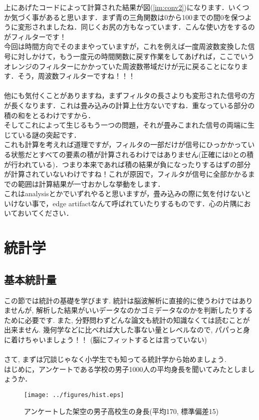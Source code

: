 \documentclass[11pt,a4paper]{ujreport}
\begin{document}
上にあげたコードによって計算された結果が図(\ref{im:conv2})になります．いくつか気づく事があると思います．まず青の三角関数は0から100までの間0を保つように変形されましたね．同じくお尻の方もなっています．こんな使い方をするのがフィルターです！\\
今回は時間方向でそのままやっていますが，これを例えば一度周波数変換した信号に対しかけて，もう一度元の時間関数に戻す作業をしてあげれば，ここでいうオレンジのフィルターにかかっていた周波数帯域だけが元に戻ることになります．そう，周波数フィルターですね！！！\\
\\
他にも気付くことがありますね，まずフィルタの長さよりも変形された信号の方が長くなります．これは畳み込みの計算上仕方ないですね．重なっている部分の積の和をとるわけですから．\\
そしてこれによって生じるもう一つの問題，それが畳みこまれた信号の両端に生じている謎の突起です．\\
これも計算を考えれば道理ですが，フィルタの一部だけが信号にひっかかっている状態だとすべての要素の積が計算されるわけではありません(正確には0との積が行われている)．つまり本来であれば積の結果が負になったりするはずの部分が計算されていないわけですね！これが原因で，フィルタが信号に全部かかるまでの範囲は計算結果が一寸おかしな挙動をします．\\
これはanalysisとかでいずれやると思いますが，畳み込みの際に気を付けないといけない事で，edge artifactなんて呼ばれていたりするものです．心の片隅においておいてください．


\chapter{統計学}
\section{基本統計量}
この節では統計の基礎を学びます. 統計は脳波解析に直接的に使うわけではありませんが, 解析した結果がいいデータなのかゴミデータなのかを判断したりするために必要です. また, 分野問わずどんな論文も統計の知識なくては読むことが出来ません. 幾何学などに比べれば大した事ない量とレベルなので, パパっと身に着けちゃいましょう！！ (脳にフィットするとは言っていない)\\
\\
さて, まずは冗談じゃなく小学生でも知ってる統計学から始めましょう.\\

はじめに，アンケートである学校の男子1000人の平均身長を聞いてみたとしましょうか．
\begin{figure}[H]
\label{im:histgram}
  \centering
  \texttt{[image: ../figures/hist.eps]}
  \caption{アンケートした架空の男子高校生の身長(平均170, 標準偏差15)}
\end{figure}
\end{document}
